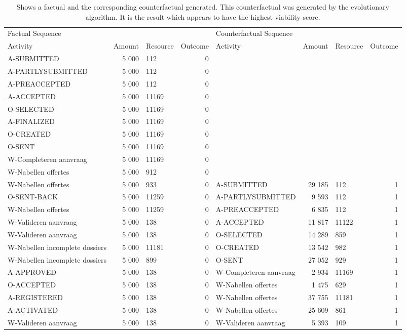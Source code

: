 \begin{table}
\caption{Shows a factual and the corresponding counterfactual generated. This counterfactual was generated by the evolutionary algorithm. It is the result which appears to have the highest viability score.}
\label{tbl:example-cf-evo}
\begin{tabular}{lrlrlrlr}
\toprule
\multicolumn{4}{l}{Factual Sequence} & \multicolumn{4}{l}{Counterfactual Sequence} \\
Activity & Amount & Resource & Outcome & Activity & Amount & Resource & Outcome \\
\midrule
A-SUBMITTED & 5 000 & 112 & 0 &  &  &  &  \\
A-PARTLYSUBMITTED & 5 000 & 112 & 0 &  &  &  &  \\
A-PREACCEPTED & 5 000 & 112 & 0 &  &  &  &  \\
A-ACCEPTED & 5 000 & 11169 & 0 &  &  &  &  \\
O-SELECTED & 5 000 & 11169 & 0 &  &  &  &  \\
A-FINALIZED & 5 000 & 11169 & 0 &  &  &  &  \\
O-CREATED & 5 000 & 11169 & 0 &  &  &  &  \\
O-SENT & 5 000 & 11169 & 0 &  &  &  &  \\
W-Completeren aanvraag & 5 000 & 11169 & 0 &  &  &  &  \\
W-Nabellen offertes & 5 000 & 912 & 0 &  &  &  &  \\
W-Nabellen offertes & 5 000 & 933 & 0 & A-SUBMITTED & 29 185 & 112 & 1 \\
O-SENT-BACK & 5 000 & 11259 & 0 & A-PARTLYSUBMITTED & 9 593 & 112 & 1 \\
W-Nabellen offertes & 5 000 & 11259 & 0 & A-PREACCEPTED & 6 835 & 112 & 1 \\
W-Valideren aanvraag & 5 000 & 138 & 0 & A-ACCEPTED & 11 817 & 11122 & 1 \\
W-Valideren aanvraag & 5 000 & 138 & 0 & O-SELECTED & 14 289 & 859 & 1 \\
W-Nabellen incomplete dossiers & 5 000 & 11181 & 0 & O-CREATED & 13 542 & 982 & 1 \\
W-Nabellen incomplete dossiers & 5 000 & 899 & 0 & O-SENT & 27 052 & 929 & 1 \\
A-APPROVED & 5 000 & 138 & 0 & W-Completeren aanvraag & -2 934 & 11169 & 1 \\
O-ACCEPTED & 5 000 & 138 & 0 & W-Nabellen offertes & 1 475 & 629 & 1 \\
A-REGISTERED & 5 000 & 138 & 0 & W-Nabellen offertes & 37 755 & 11181 & 1 \\
A-ACTIVATED & 5 000 & 138 & 0 & W-Nabellen offertes & 25 609 & 861 & 1 \\
W-Valideren aanvraag & 5 000 & 138 & 0 & W-Valideren aanvraag & 5 393 & 109 & 1 \\
\bottomrule
\end{tabular}
\end{table}
